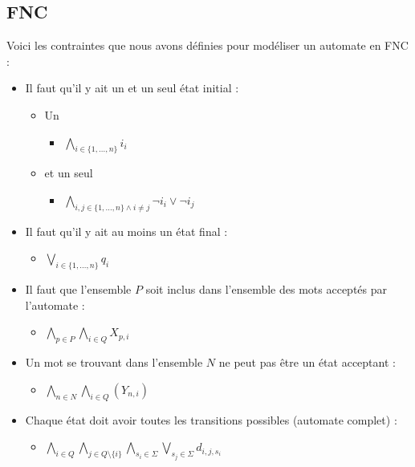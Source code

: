 \documentclass[a4paper, 12pt]{extarticle}
\begin{document}
\subsection{FNC} %
\label{sub:fnc} 

Voici les contraintes que nous avons définies pour modéliser un automate en FNC : 
\begin{itemize}[label=$\bullet$]
    \item Il faut qu'il y ait un et un seul état initial :
    \begin{itemize}[label=$\circ$]
        \item Un
            \begin{itemize}[label=$\diamond$]
                \item $\bigwedge_{i \in \{1, \dots, n\}} i_i$
            \end{itemize}
        \item et un seul
            \begin{itemize}[label=$\diamond$]
                \item $\bigwedge_{i, j \in \{1, \dots, n\} \wedge i \neq j}  \neg i_i \vee \neg i_j$
            \end{itemize} 

    \end{itemize}
    \item Il faut qu'il y ait au moins un état final : 
    \begin{itemize}[label=$\circ$]
        \item $\bigvee_{i \in \{1, \dots, n\}} q_i$
    \end{itemize}
    \item Il faut que l'ensemble $P$ soit inclus dans l'ensemble des mots acceptés par l'automate : 
    \begin{itemize}[label=$\circ$]
        \item $\bigwedge_{p \in P} \bigwedge_{i \in Q} X_{p, i}$
    \end{itemize}
    \item Un mot se trouvant dans l'ensemble $N$ ne peut pas être un état acceptant : 
    \begin{itemize}[label=$\circ$]
        \item $\bigwedge_{n\in N}\bigwedge_{i\in Q}(Y_{n,i})$
    \end{itemize} 
    \item Chaque état doit avoir toutes les transitions possibles (automate complet) : 
    \begin{itemize}[label=$\circ$]
        \item $\bigwedge_{i \in Q} \bigwedge_{j \in Q \setminus \{i\}} \bigwedge_{s_i \in \Sigma} \bigvee_{s_j \in \Sigma} d_{i, j, s_i}$ 
    \end{itemize} 
\end{itemize} 
\end{document}
